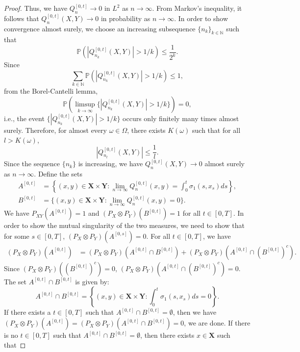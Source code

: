 \documentclass[10pt,a4paper]{amsart}
\begin{document}
\begin{proof}
    Thus, we have $Q_n^{[0,t]}\to 0$ in $L^2$ as $n\to\infty$. From Markov's inequality, it follows that $Q_n^{[0,t]}(X,Y)\to0$ in probability as $n\to\infty$. In order to show convergence almost surely, we choose an increasing subsequence $\{n_k\}_{k\in \mathbb{N}}$ such that
    \begin{equation*}
        \mathbb{P}(|Q^{[0,t]}_{n_k}(X,Y)|>1/k) \leq \frac{1}{2^k}.
    \end{equation*}
    Since
    \[
        \sum_{k\in\mathbb{N}}\mathbb{P}(|Q^{[0,t]}_{n_k}(X,Y)|>1/k)  \leq 1,
    \]
    from the Borel-Cantelli lemma,
    \begin{equation*}
        \mathbb{P}(\limsup_{k\to\infty}\{|Q^{[0,t]}_{n_k}(X,Y)|>1/k\}) = 0,
    \end{equation*}
    i.e., the event $\{|Q^{[0,t]}_{n_k}(X,Y)|>1/k\}$ occurs only finitely many times almost surely.
    Therefore, for almost every $\omega\in\Omega$, there exists $K(\omega)$ such that for all $l>K(\omega)$,
    \[
        |Q^{[0,t]}_{n_l}(X,Y)|\leq\frac{1}{l}.
    \]
    Since the sequence $\{n_k\}$ is increasing, we have $Q_n^{[0,t]}(X,Y) \to 0$ almost surely as $n\to\infty$.
    Define the sets
    \begin{align*}
        A^{[0,t]} &= \left\{(x,y)\in\mathbf{X\times Y}:\lim_{n\to\infty}Q_n^{[0,t]}(x,y) = \int_0^t\sigma_1(s,x_s)ds\right\},\\
        B^{[0,t]} &= \{(x,y)\in\mathbf{X\times Y}:\lim_{n\to\infty}Q_n^{[0,t]}(x,y) =0\}.
    \end{align*}
    We have $P_{XY}(A^{[0,t]}) = 1$ and $(P_X\otimes P_Y)(B^{[0,t]}) =1$ for all $t\in [0,T]$. In order to show the mutual singularity of the two measures, we need to show that for some $s\in[0,T]$, $(P_X\otimes P_Y)(A^{[0,s]}) = 0$. For all $t\in[0,T]$, we have
    \begin{align*}
        (P_X\otimes P_Y)(A^{[0,t]}) &= (P_X\otimes P_Y)(A^{[0,t]}\cap B^{[0,t]}) + (P_X\otimes P_Y)(A^{[0,t]}\cap (B^{[0,t]})^c).
    \end{align*}
    Since $(P_X\otimes P_Y)((B^{[0,t]})^c) = 0$, $(P_X\otimes P_Y)(A^{[0,t]}\cap (B^{[0,t]})^c) = 0$. The set $A^{[0,t]}\cap B^{[0,t]}$ is given by:
    \begin{equation*}
        A^{[0,t]}\cap B^{[0,t]} = \left\{(x,y)\in\mathbf{X\times Y}:\int_0^t\sigma_1(s,x_s)ds = 0\right\}.
    \end{equation*}
    If there exists a $t\in[0,T]$ such that $A^{[0,t]}\cap B^{[0,t]} = \emptyset$, then we have $(P_X\otimes P_Y)(A^{[0,t]}) = (P_X\otimes P_Y)(A^{[0,t]}\cap B^{[0,t]}) = 0$, we are done. If there is no $t\in[0,T]$ such that $A^{[0,t]}\cap B^{[0,t]} = \emptyset$, then there exists $x\in\mathbf{X}$ such that

\end{proof}
\end{document}
